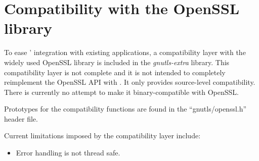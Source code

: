 \section{Compatibility with the OpenSSL library}

To ease \gnutls{}' integration with existing applications, a compatibility 
layer with the widely used OpenSSL library is included in the \emph{gnutls-extra}
library. This compatibility layer is not complete and it is not 
intended to completely reimplement the OpenSSL API with \gnutls{}.
It only provides source-level compatibility. There is currently no
attempt to make it binary-compatible with OpenSSL.

Prototypes for the compatibility functions are found in the 
``gnutls/openssl.h'' header file.

Current limitations imposed by the compatibility layer include:

\begin{itemize}

\item Error handling is not thread safe.

\end{itemize}

